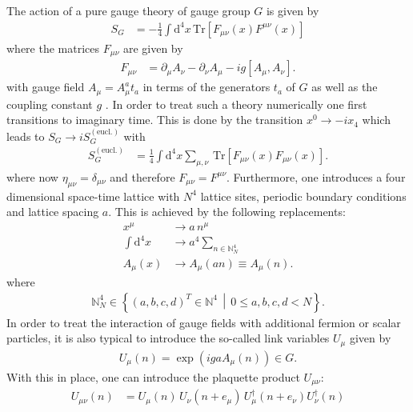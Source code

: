 The action of a pure gauge theory of gauge group $G$ is given by
\begin{align*}
 S_G & = -\frac{1}{4} \int \mathrm{d}^4 x \, \mathrm{Tr} \left[ F_{\mu \nu} (x) F^{\mu \nu} (x) \right]
\end{align*}
where the matrices $F_{\mu \nu}$ are given by
\begin{align*}
 F_{\mu \nu} & =  \partial_\mu A_\nu - \partial_\nu A_\mu  -  i g [A_\mu, A_\nu] \textrm{.}
\end{align*}
with gauge field $A_\mu = A_\mu^a t_a$ in terms of the generators $t_a$ of $G$ as well as the coupling constant $g$ \cite{Peskin:1995}. In order to treat such a theory numerically one first transitions to imaginary time. This is done by the transition $x^0 \rightarrow -i x_4$ which leads to $S_G \rightarrow i S_G^{(\textrm{eucl.})}$ with
\begin{align*}
 S_G^{(\textrm{eucl.})} & = \frac{1}{4} \int \mathrm{d}^4 x  \sum_{\mu,\nu}  \, \mathrm{Tr} \left[ F_{\mu \nu} (x) F_{\mu \nu} (x) \right] \textrm{.}
\end{align*}
where now $\eta_{\mu \nu} = \delta_{\mu \nu}$ and therefore $F_{\mu \nu} = F^{\mu \nu}$. Furthermore, one introduces a four dimensional space-time lattice  with $N^4$ lattice sites, periodic boundary conditions and lattice spacing $a$. This is achieved by the following replacements:
\begin{align*}
 x^\mu               & \rightarrow a \, n^\mu                           \\
 \int \mathrm{d}^4 x & \rightarrow a^4 \sum_{n \in \mathbb{N}^4_N}        \\
 A_\mu (x)           & \rightarrow A_\mu(an) \equiv A_\mu(n) \textrm{.}
\end{align*}
where
\begin{align*}
 \mathbb{N}^4_N \in \left\{ (a,b,c,d)^T \in \mathbb{N}^4 \, \middle| \, 0 \le a,b,c,d < N \right\} \textrm{.}
\end{align*}
In order to treat the interaction of gauge fields with additional fermion or scalar particles, it is also typical to introduce the so-called link variables $U_\mu$ given by
\begin{align*}
 U_\mu(n) = \exp \left( i g a A_\mu(n) \right) \in G \textrm{.}
\end{align*}
With this in place, one can introduce the plaquette product $U_{\mu \nu}$:
\begin{align*}
 U_{\mu \nu}(n) & = U_\mu(n) \, U_\nu(n+e_\mu) \, U^\dagger_\mu (n + e_\nu) U^\dagger_\nu(n)
\end{align*}
